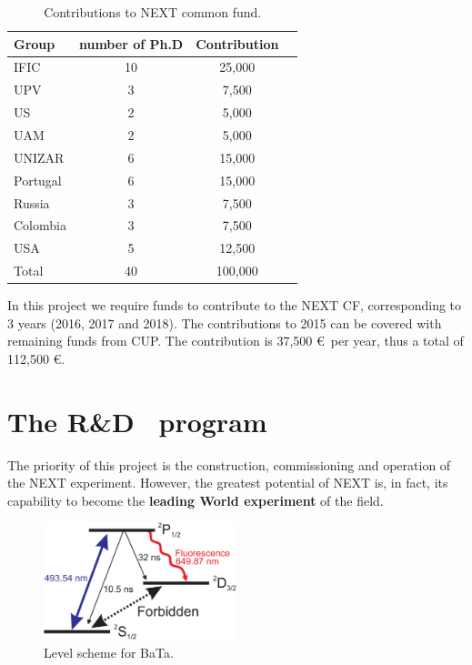 \documentclass[a4paper,11pt,oneside]{article}
\begin{document}
\begin{table}[h!]
\begin{center}
\begin{tabular}{|l|c|c|c|}
\hline
Group &	number of Ph.D & 	Contribution \\
\hline
IFIC &	10	& 25,000 \\
UPV	& 3 &	7,500 \\
US	& 2	& 5,000 \\
UAM	  & 2 & 	5,000 \\
UNIZAR	& 6	& 15,000 \\
Portugal 	& 6	& 15,000 \\
Russia	& 3	& 7,500 \\
Colombia	& 3	& 7,500 \\
USA	& 5 & 	12,500 \\
\hline
Total & 40& 100,000 \\
 \hline\hline
\end{tabular}  
\caption{Contributions to NEXT common fund.}
\label{tab.CFD}
\end{center}
\end{table} 

In this project we require funds to contribute to the NEXT CF, corresponding to 3 years (2016, 2017 and 2018). The contributions to 2015 can be covered with remaining funds from CUP. The contribution is
37,500 \euro\ per year, thus a total of 112,500 \euro. 
		
\section{\bf The R\&D \BATA\ program}
\label{sec.bata}
The priority of this project is the construction, commissioning and operation of the NEXT experiment. However, the greatest potential of NEXT is, in fact, its capability to become the {\bf leading World experiment} of the field. 

\begin{figure}
\centering
\includegraphics[width=0.5\textwidth]{img/levelscheme.pdf}
\caption{\label{fig.levelscheme} Level scheme for BaTa.} 
\end{figure}
	
\end{document}
